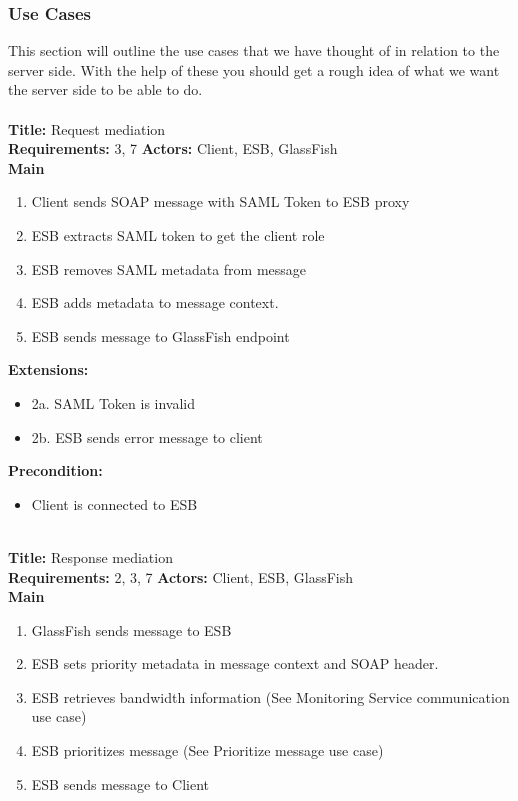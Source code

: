     \subsubsection{Use Cases}\label{Server Use Cases}
    This section will outline the use cases that we have thought of in relation to the server side. With the help of these you should get a rough idea of what we want the server side to be able to do.\\\\
    \textbf{Title:} Request mediation\\
    \textbf{Requirements:} 3, 7
    \textbf{Actors:} Client, ESB, GlassFish\\
    \textbf{Main}
    \begin{enumerate}
        \item Client sends SOAP message with SAML Token to ESB proxy
        \item ESB extracts SAML token to get the client role
        \item ESB removes SAML metadata from message
        \item ESB adds metadata to message context.
        \item ESB sends message to GlassFish endpoint
    \end{enumerate}
    \textbf{Extensions:}
    \begin{itemize}
        \item[] 2a. SAML Token is invalid
        \item[] 2b. ESB sends error message to client
    \end{itemize}
    \textbf{Precondition:}
    \begin{itemize}
        \item Client is connected to ESB
    \end{itemize}
    ~\\
    \textbf{Title:} Response mediation \\
    \textbf{Requirements:} 2, 3, 7
    \textbf{Actors:} Client, ESB, GlassFish \\
    \textbf{Main}
    \begin{enumerate}
        \item GlassFish sends message to ESB
        \item ESB sets priority metadata in message context and SOAP header.
        \item ESB retrieves bandwidth information (See Monitoring Service communication use case)
        \item ESB prioritizes message (See Prioritize message use case)
        \item ESB sends message to Client
    \end{enumerate}
